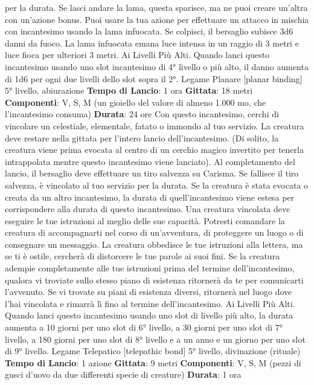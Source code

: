 \begin{multicols}{2}
per la durata. Se lasci andare la lama, questa sparisce,
ma ne puoi creare un’altra con un’azione bonus.
Puoi usare la tua azione per effettuare un attacco in
mischia con incantesimo usando la lama infuocata. Se
colpisci, il bersaglio subisce 3d6 danni da fuoco.
La lama infuocata emana luce intensa in un raggio di 3
metri e luce fioca per ulteriori 3 metri.
Ai Livelli Più Alti. Quando lanci questo incantesimo
usando uno slot incantesimo di 4° livello o più alto, il
danno aumenta di 1d6 per ogni due livelli dello slot
sopra il 2°.
Legame Planare
[planar binding]
5° livello, abiurazione
\textbf{Tempo di Lancio}: 1 ora
\textbf{Gittata}: 18 metri
\textbf{Componenti}: V, S, M (un gioiello del valore di almeno
1.000 mo, che l’incantesimo consuma)
\textbf{Durata}: 24 ore
Con questo incantesimo, cerchi di vincolare un
celestiale, elementale, fatato o immondo al tuo servizio.
La creatura deve restare nella gittata per l’intero lancio
dell’incantesimo. (Di solito, la creatura viene prima
evocata al centro di un cerchio magico invertito per
tenerla intrappolata mentre questo incantesimo viene
lanciato). Al completamento del lancio, il bersaglio deve
effettuare un tiro salvezza su Carisma. Se fallisce il tiro
salvezza, è vincolato al tuo servizio per la durata. Se la
creatura è stata evocata o creata da un altro
incantesimo, la durata di quell’incantesimo viene estesa
per corrispondere alla durata di questo incantesimo.
Una creatura vincolata deve eseguire le tue istruzioni al
meglio delle sue capacità. Potresti comandare la
creatura di accompagnarti nel corso di un’avventura, di
proteggere un luogo o di consegnare un messaggio. La
creatura obbedisce le tue istruzioni alla lettera, ma se ti
è ostile, cercherà di distorcere le tue parole ai suoi fini.
Se la creatura adempie completamente alle tue
istruzioni prima del termine dell’incantesimo, qualora vi
troviate sullo stesso piano di esistenza ritornerà da te
per comunicarti l’avvenuto. Se vi trovate su piani di
esistenza diversi, ritornerà nel luogo dove l’hai vincolata
e rimarrà lì fino al termine dell’incantesimo.
Ai Livelli Più Alti. Quando lanci questo incantesimo
usando uno slot di livello più alto, la durata aumenta a
10 giorni per uno slot di 6° livello, a 30 giorni per uno
slot di 7° livello, a 180 giorni per uno slot di 8° livello e a
un anno e un giorno per uno slot di 9° livello.
Legame Telepatico
[telepathic bond]
5° livello, divinazione (rituale)
\textbf{Tempo di Lancio}: 1 azione
\textbf{Gittata}: 9 metri
\textbf{Componenti}: V, S, M (pezzi di gusci d’uovo da due
differenti specie di creature)
\textbf{Durata}: 1 ora

\end{multicols}
